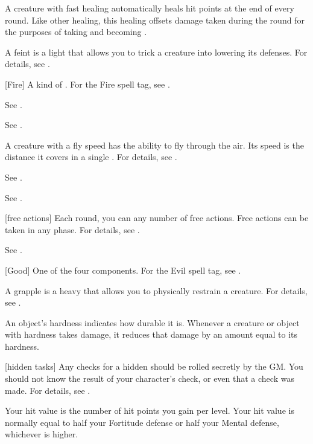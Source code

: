  A creature with fast healing automatically heals hit points at the end of every round.
Like other healing, this healing offsets damage taken during the round for the purposes of taking  and becoming \disabled.

 A feint is a light  that allows you to trick a creature into lowering its defenses.
For details, see .

[Fire] A kind of . For the Fire spell tag, see .

 See .

 See .

 A creature with a fly speed has the ability to fly through the air.
Its speed is the distance it covers in a single .
For details, see .

 See .

 See .

[free actions] Each round, you can any number of free actions.
Free actions can be taken in any phase.
For details, see .

 See .

[Good] One of the four  components. For the Evil spell tag, see .

 A grapple is a heavy  that allows you to physically restrain a creature.
For details, see .

 An object's hardness indicates how durable it is.
Whenever a creature or object with hardness takes damage, it reduces that damage by an amount equal to its hardness.

[hidden tasks] Any checks for a hidden  should be rolled secretly by the GM.\@
You should not know the result of your character's check, or even that a check was made.
For details, see .

 Your hit value is the number of hit points you gain per level.
Your hit value is normally equal to half your Fortitude defense or half your Mental defense, whichever is higher.

